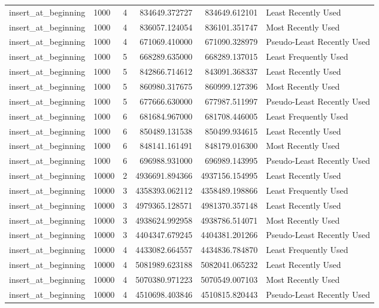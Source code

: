 \begin{tabular}{llrrrl}
insert_at_beginning & 1000 & 4 & 834649.372727 & 834649.612101 & Least Recently Used \\
insert_at_beginning & 1000 & 4 & 836057.124054 & 836101.351747 & Most Recently Used \\
insert_at_beginning & 1000 & 4 & 671069.410000 & 671090.328979 & Pseudo-Least Recently Used \\
insert_at_beginning & 1000 & 5 & 668289.635000 & 668289.137015 & Least Frequently Used \\
insert_at_beginning & 1000 & 5 & 842866.714612 & 843091.368337 & Least Recently Used \\
insert_at_beginning & 1000 & 5 & 860980.317675 & 860999.127396 & Most Recently Used \\
insert_at_beginning & 1000 & 5 & 677666.630000 & 677987.511997 & Pseudo-Least Recently Used \\
insert_at_beginning & 1000 & 6 & 681684.967000 & 681708.446005 & Least Frequently Used \\
insert_at_beginning & 1000 & 6 & 850489.131538 & 850499.934615 & Least Recently Used \\
insert_at_beginning & 1000 & 6 & 848141.161491 & 848179.016300 & Most Recently Used \\
insert_at_beginning & 1000 & 6 & 696988.931000 & 696989.143995 & Pseudo-Least Recently Used \\
insert_at_beginning & 10000 & 2 & 4936691.894366 & 4937156.154995 & Least Recently Used \\
insert_at_beginning & 10000 & 3 & 4358393.062112 & 4358489.198866 & Least Frequently Used \\
insert_at_beginning & 10000 & 3 & 4979365.128571 & 4981370.357148 & Least Recently Used \\
insert_at_beginning & 10000 & 3 & 4938624.992958 & 4938786.514071 & Most Recently Used \\
insert_at_beginning & 10000 & 3 & 4404347.679245 & 4404381.201266 & Pseudo-Least Recently Used \\
insert_at_beginning & 10000 & 4 & 4433082.664557 & 4434836.784870 & Least Frequently Used \\
insert_at_beginning & 10000 & 4 & 5081989.623188 & 5082041.065232 & Least Recently Used \\
insert_at_beginning & 10000 & 4 & 5070380.971223 & 5070549.007103 & Most Recently Used \\
insert_at_beginning & 10000 & 4 & 4510698.403846 & 4510815.820443 & Pseudo-Least Recently Used \\

\end{tabular}
